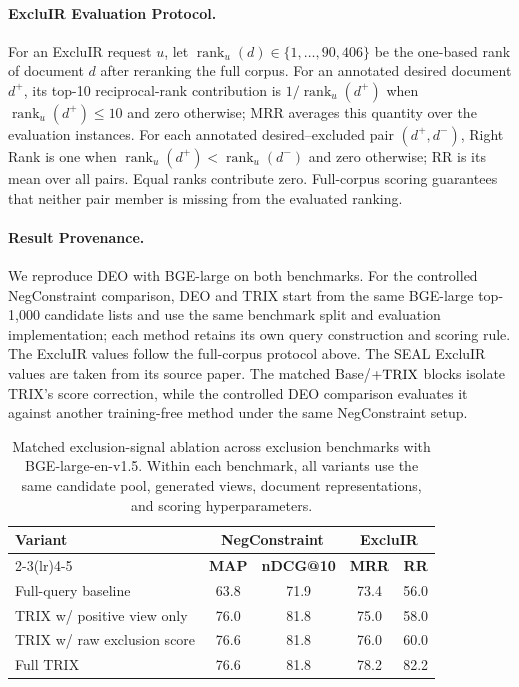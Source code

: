 \documentclass[letterpaper]{article}
\newcommand{\method}{\ifmmode \mathrm{TRIX}\else TRIX\xspace\fi}
\begin{document}
\paragraph{ExcluIR Evaluation Protocol.}
For an ExcluIR request $u$, let
$\operatorname{rank}_u(d)\in\{1,\ldots,90{,}406\}$ be the one-based rank of
document $d$ after reranking the full corpus.  For an annotated desired
document $d^+$, its top-10 reciprocal-rank contribution is
$1/\operatorname{rank}_u(d^+)$ when $\operatorname{rank}_u(d^+)\leq10$ and
zero otherwise; MRR averages this quantity over the evaluation instances.
For each annotated desired--excluded pair $(d^+,d^-)$, Right Rank is one when
$\operatorname{rank}_u(d^+)<\operatorname{rank}_u(d^-)$ and zero otherwise;
RR is its mean over all pairs.  Equal ranks contribute zero.  Full-corpus
scoring guarantees that neither pair member is missing from the evaluated
ranking.

\paragraph{Result Provenance.}
We reproduce DEO with BGE-large on both benchmarks.  For the controlled
NegConstraint comparison, DEO and \method{} start from the same BGE-large
top-1,000 candidate lists and use the same benchmark split and evaluation
implementation; each method retains its own query construction and scoring
rule.  The ExcluIR values follow the full-corpus protocol above.  The SEAL
ExcluIR values are taken from its source paper.  The matched
Base/$+\method$ blocks isolate \method's score correction, while the controlled
DEO comparison evaluates it against another training-free method under the
same NegConstraint setup.

\begin{table}[t]
\centering
\small
\setlength{\tabcolsep}{3.2pt}
\begin{tabular}{p{1.18in}cccc}
\toprule
\multirow{2}{*}{\textbf{Variant}} &
\multicolumn{2}{c}{\textbf{NegConstraint}} &
\multicolumn{2}{c}{\textbf{ExcluIR}} \\
\cmidrule(lr){2-3}\cmidrule(lr){4-5}
& \textbf{MAP} & \textbf{nDCG@10} & \textbf{MRR} & \textbf{RR} \\
\midrule
Full-query baseline & 63.8 & 71.9 & 73.4 & 56.0 \\
\method{} w/ positive view only & 76.0 & 81.8 & 75.0 & 58.0 \\
\method{} w/ raw exclusion score & 76.6 & 81.8 & 76.0 & 60.0 \\
Full \method{} & 76.6 & 81.8 & 78.2 & 82.2 \\
\bottomrule
\end{tabular}
\caption{Matched exclusion-signal ablation across exclusion benchmarks with
BGE-large-en-v1.5.  Within each benchmark, all variants use the same candidate
pool, generated views, document representations, and scoring hyperparameters.}
\label{tab:exclusion-ablation}
\end{table}
\end{document}
